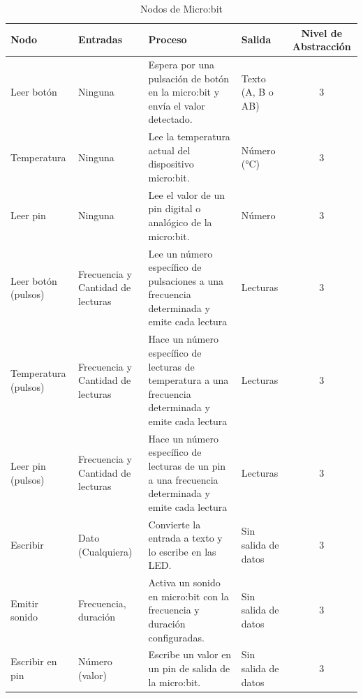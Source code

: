 \begin{table}[H]
    \centering
    \caption{Nodos de Micro:bit}
    \begin{tabularx}{\textwidth}{ l X X X c }
        \hline
        \textbf{Nodo}        & \textbf{Entradas}                 & \textbf{Proceso}                                                                                       & \textbf{Salida}     & \textbf{Nivel de Abstracción} \\ \hline
        Leer botón           & Ninguna                           & Espera por una pulsación de botón en la micro:bit y envía el valor detectado.                          & Texto (A, B o AB)   & 3                             \\
        Temperatura          & Ninguna                           & Lee la temperatura actual del dispositivo micro:bit.                                                   & Número (°C)         & 3                             \\
        Leer pin             & Ninguna                           & Lee el valor de un pin digital o analógico de la micro:bit.                                            & Número              & 3                             \\
        Leer botón (pulsos)  & Frecuencia y Cantidad de lecturas & Lee un número específico de pulsaciones a una frecuencia determinada y emite cada lectura              & Lecturas            & 3                             \\
        Temperatura (pulsos) & Frecuencia y Cantidad de lecturas & Hace un número específico de lecturas de temperatura a una frecuencia determinada y emite cada lectura & Lecturas            & 3                             \\
        Leer pin (pulsos)    & Frecuencia y Cantidad de lecturas & Hace un número específico de lecturas de un pin a una frecuencia determinada y emite cada lectura      & Lecturas            & 3                             \\
        Escribir             & Dato (Cualquiera)                 & Convierte la entrada a texto y lo escribe en las LED.                                                  & Sin salida de datos & 3                             \\
        Emitir sonido        & Frecuencia, duración              & Activa un sonido en micro:bit con la frecuencia y duración configuradas.                               & Sin salida de datos & 3                             \\
        Escribir en pin      & Número (valor)                    & Escribe un valor en un pin de salida de la micro:bit.                                                  & Sin salida de datos & 3                             \\ \hline
    \end{tabularx}
\end{table}

